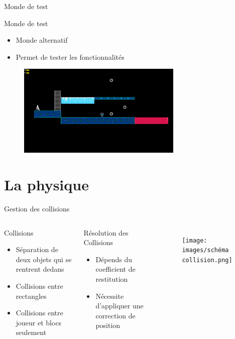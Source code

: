 \documentclass{beamer}
\begin{document}
{\begin{frame}{Monde de test}
    \begin{block}{Monde de test}
        \begin{itemize}
            \item[\bullet] Monde alternatif
            \item[\bullet] Permet de tester les fonctionnalités
        \end{itemize}
    \end{block}
    \begin{figure}
        \centering
        \includegraphics[width=0.7\textwidth]{test_world}
    \end{figure}
\end{frame}

\section{La physique}
\begin{frame}{Gestion des collisions}
    \begin{columns}
        \begin{block}{Collisions}
            \begin{itemize}
                \item[\bullet] Séparation de deux objets qui se rentrent dedans
                \item[\bullet] Collisions entre rectangles
                \item[\bullet] Collisions entre joueur et blocs seulement
            \end{itemize}
        \end{block}
        \begin{block}{Résolution des Collisions}
            \begin{itemize}
                \item[\bullet] Dépends du coefficient de restitution
                \item[\bullet] Nécessite d'appliquer une correction de position
            \end{itemize}
        \end{block}
        \begin{figure}
            \centering
            \texttt{[image: images/schéma collision.png]}
        \end{figure}
    \end{columns}
\end{frame}

}
\end{document}
